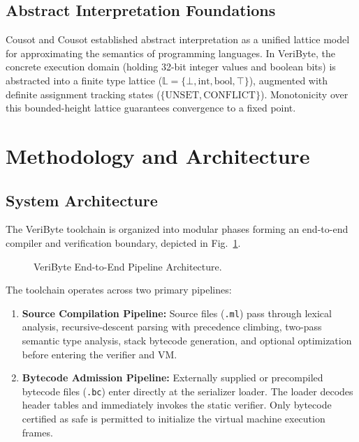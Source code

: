 \documentclass[conference]{IEEEtran}
\begin{document}
\subsection{Abstract Interpretation Foundations}
Cousot and Cousot \cite{cousot1977abstract} established abstract interpretation as a unified lattice model for approximating the semantics of programming languages. In VeriByte, the concrete execution domain (holding 32-bit integer values and boolean bits) is abstracted into a finite type lattice ($\mathbb{L} = \{\bot, \text{int}, \text{bool}, \top\}$), augmented with definite assignment tracking states ($\{\text{UNSET}, \text{CONFLICT}\}$). Monotonicity over this bounded-height lattice guarantees convergence to a fixed point.

\section{Methodology and Architecture}

\subsection{System Architecture}
The VeriByte toolchain is organized into modular phases forming an end-to-end compiler and verification boundary, depicted in Fig.~\ref{fig:arch}.

\begin{figure}[htbp]
\centering
{}
\caption{VeriByte End-to-End Pipeline Architecture.}
\label{fig:arch}
\end{figure}

The toolchain operates across two primary pipelines:
\begin{enumerate}
    \item \textbf{Source Compilation Pipeline:} Source files (\texttt{.ml}) pass through lexical analysis, recursive-descent parsing with precedence climbing, two-pass semantic type analysis, stack bytecode generation, and optional optimization before entering the verifier and VM.
    \item \textbf{Bytecode Admission Pipeline:} Externally supplied or precompiled bytecode files (\texttt{.bc}) enter directly at the serializer loader. The loader decodes header tables and immediately invokes the static verifier. Only bytecode certified as safe is permitted to initialize the virtual machine execution frames.
\end{enumerate}
\end{document}
